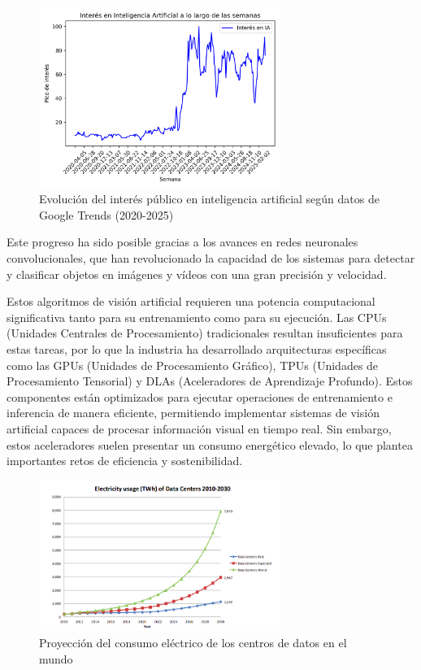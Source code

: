 \documentclass[11pt,spanish,listoffigures,listoftables]{tfgetsinf}
\begin{document}
\begin{figure}[H]
   \centering
   \includegraphics[width=0.7\textwidth]{excels/introduccion/interes_en_ia.png}
   \caption{Evolución del interés público en inteligencia artificial según datos de Google Trends (2020-2025)}
\label{fig:interes_en_inteligencia_artificial}
\end{figure}

Este progreso ha sido posible gracias a los avances en redes neuronales convolucionales, que han revolucionado la capacidad de los sistemas para detectar y clasificar objetos en imágenes y vídeos con una gran precisión y velocidad.

Estos algoritmos de visión artificial requieren una potencia computacional significativa tanto para su entrenamiento como para su ejecución. Las CPUs (Unidades Centrales de Procesamiento) tradicionales resultan insuficientes para estas tareas, por lo que la industria ha desarrollado arquitecturas específicas como las GPUs (Unidades de Procesamiento Gráfico), TPUs (Unidades de Procesamiento Tensorial) y DLAs (Aceleradores de Aprendizaje Profundo). Estos componentes están optimizados para ejecutar operaciones de entrenamiento e inferencia de manera eficiente, permitiendo implementar sistemas de visión artificial capaces de procesar información visual en tiempo real. Sin embargo, estos aceleradores suelen presentar un consumo energético elevado, lo que plantea importantes retos de eficiencia y sostenibilidad.


\begin{figure}[H]
   \centering
   \includegraphics[width=0.7\textwidth]{images/introduccion/consumo_electrico_datacenters.png}
   \caption{Proyección del consumo eléctrico de los centros de datos en el mundo}
\label{fig:consumo_electrico_datacenters}
\end{figure}
\end{document}
